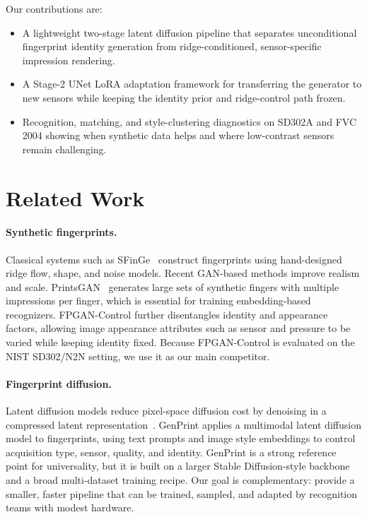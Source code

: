 \documentclass{article}
\begin{document}
Our contributions are:
\begin{itemize}
    \item A lightweight two-stage latent diffusion pipeline that separates
    unconditional fingerprint identity generation from ridge-conditioned,
    sensor-specific impression rendering.
    \item A Stage-2 UNet LoRA adaptation framework for transferring the
    generator to new sensors while keeping the identity prior and ridge-control
    path frozen.
    \item Recognition, matching, and style-clustering diagnostics on SD302A and
    FVC 2004 showing when synthetic data helps and where low-contrast sensors
    remain challenging.
\end{itemize}

\section{Related Work}
\label{sec:related}

\paragraph{Synthetic fingerprints.}
Classical systems such as SFinGe~\cite{cappelli2002synthetic} construct
fingerprints using hand-designed ridge flow, shape, and noise models.  Recent
GAN-based methods improve realism and scale.  PrintsGAN~\cite{engelsma2022prints}
generates large sets of synthetic fingers with multiple impressions per finger,
which is essential for training embedding-based recognizers.  FPGAN-Control
\cite{shoshan2023fpgan} further disentangles identity and appearance factors,
allowing image appearance attributes such as sensor and pressure to be varied
while keeping identity fixed.  Because FPGAN-Control is evaluated on the NIST
SD302/N2N setting, we use it as our main competitor.

\paragraph{Fingerprint diffusion.}
Latent diffusion models reduce pixel-space diffusion cost by denoising in a
compressed latent representation~\cite{rombach2022ldm}.  GenPrint
\cite{grosz2024genprint} applies a multimodal latent diffusion model to
fingerprints, using text prompts and image style embeddings to control
acquisition type, sensor, quality, and identity.  GenPrint is a strong
reference point for universality, but it is built on a larger Stable
Diffusion-style backbone and a broad multi-dataset training recipe.  Our goal
is complementary: provide a smaller, faster pipeline that can be trained,
sampled, and adapted by recognition teams with modest hardware.
\end{document}
